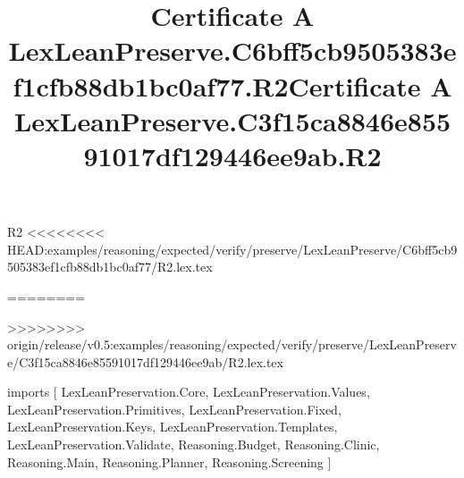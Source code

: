 \begin{lexlean}{R2}
<<<<<<<< HEAD:examples/reasoning/expected/verify/preserve/LexLeanPreserve/C6bff5cb9505383ef1cfb88db1bc0af77/R2.lex.tex
\title{Certificate A LexLeanPreserve.C6bff5cb9505383ef1cfb88db1bc0af77.R2}
========
\title{Certificate A LexLeanPreserve.C3f15ca8846e85591017df129446ee9ab.R2}
>>>>>>>> origin/release/v0.5:examples/reasoning/expected/verify/preserve/LexLeanPreserve/C3f15ca8846e85591017df129446ee9ab/R2.lex.tex
\begin{coremodule}
imports [
  LexLeanPreservation.Core,
  LexLeanPreservation.Values,
  LexLeanPreservation.Primitives,
  LexLeanPreservation.Fixed,
  LexLeanPreservation.Keys,
  LexLeanPreservation.Templates,
  LexLeanPreservation.Validate,
  Reasoning.Budget,
  Reasoning.Clinic,
  Reasoning.Main,
  Reasoning.Planner,
  Reasoning.Screening
]


\end{coremodule}
\end{lexlean}
